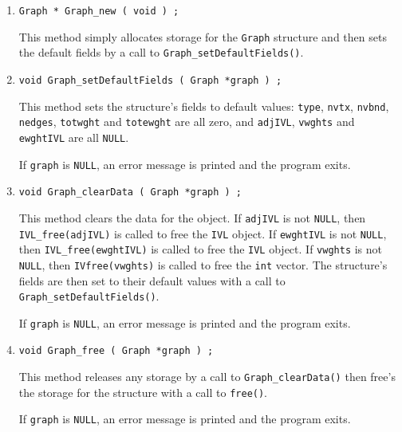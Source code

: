 \begin{enumerate}
\item
\begin{verbatim}
Graph * Graph_new ( void ) ;
\end{verbatim}
This method simply allocates storage for the {\tt Graph} structure 
and then sets the default fields by a call to 
{\tt Graph\_setDefaultFields()}.
\item
\begin{verbatim}
void Graph_setDefaultFields ( Graph *graph ) ;
\end{verbatim}
This method sets the structure's fields to default values:
{\tt type}, {\tt nvtx}, {\tt nvbnd}, {\tt nedges}, {\tt totwght} and
{\tt totewght} are all zero, and {\tt adjIVL}, {\tt vwghts} and
{\tt ewghtIVL} are all {\tt NULL}.
\par {}
If {\tt graph} is {\tt NULL},
an error message is printed and the program exits.
\item
\begin{verbatim}
void Graph_clearData ( Graph *graph ) ;
\end{verbatim}
This method clears the data for the object.
If {\tt adjIVL} is not {\tt NULL}, 
then {\tt IVL\_free(adjIVL)} is called to free the {\tt IVL}
object.
If {\tt ewghtIVL} is not {\tt NULL}, 
then {\tt IVL\_free(ewghtIVL)} is called to free the {\tt IVL}
object.
If {\tt vwghts} is not {\tt NULL}, 
then {\tt IVfree(vwghts)} is called to free the {\tt int}
vector.
The structure's fields are then set to their default values
with a call to {\tt Graph\_setDefaultFields()}.
\par {}
If {\tt graph} is {\tt NULL},
an error message is printed and the program exits.
\item
\begin{verbatim}
void Graph_free ( Graph *graph ) ;
\end{verbatim}
This method releases any storage by a call to 
{\tt Graph\_clearData()} then free's the storage for the 
structure with a call to {\tt free()}.
\par {}
If {\tt graph} is {\tt NULL},
an error message is printed and the program exits.
\end{enumerate}
\par

